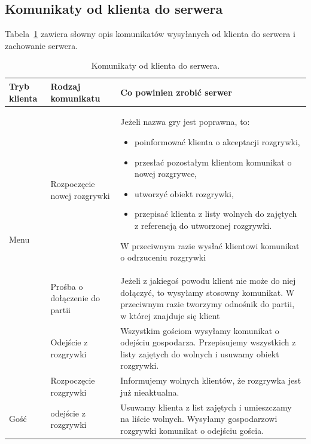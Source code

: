 \documentclass[a4paper, 12pt]{article}
\begin{document}
\subsection{Komunikaty od klienta do serwera}
Tabela~\ref{tab:klidoser} zawiera słowny opis komunikatów wysyłanych od klienta do serwera i zachowanie serwera.

\begin{table}
\begin{center}
 \begin{tabular}{p{2cm}||p{3.5cm}||p{9cm}}
 \hbox{Tryb} klienta& Rodzaj komunikatu & Co powinien zrobić serwer\\ \hline \hline
\multirow{3}{*}{Menu}
  & Rozpoczęcie nowej rozgrywki
  & Jeżeli nazwa gry jest poprawna, to:
      \begin{itemize}
      \item poinformować klienta o akceptacji rozgrywki,
      \item przesłać pozostałym klientom komunikat o nowej rozgrywce,
      \item utworzyć obiekt rozgrywki,
      \item przepisać klienta z listy wolnych do zajętych z referencją do utworzonej rozgrywki.
      \end{itemize}
    W przeciwnym razie wysłać klientowi komunikat o odrzuceniu rozgrywki \\ \cline{2-3}

  & Prośba o dołączenie do partii
  & Jeżeli z jakiegoś powodu klient nie może do niej dołączyć, to wysyłamy stosowny komunikat. W przeciwnym razie tworzymy odnośnik do partii, w której znajduje się klient\\ \hline

\multirow{2}{*}{Gospodarz}
  & Odejście z rozgrywki
  & Wszystkim gościom wysyłamy komunikat o odejściu gospodarza. Przepisujemy wszystkich z listy zajętych do wolnych i usuwamy obiekt rozgrywki.\\ \cline{2-3}

  & Rozpoczęcie rozgrywki
  & Informujemy wolnych klientów, że rozgrywka jest już nieaktualna.\\ \hline \hline

Gość & odejście z rozgrywki & Usuwamy klienta z list zajętych i umieszczamy na liście wolnych. Wysyłamy gospodarzowi rozgrywki komunikat o odejściu gościa.

\end{tabular}
\caption{Komunikaty od klienta do serwera.}
\label{tab:klidoser}
\end{center}
\end{table}
\end{document}
